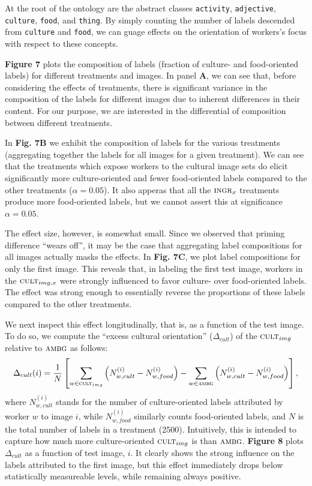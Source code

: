 \documentclass[a4paper]{report}
\begin{document}
At the root of the ontology are the abstract classes \texttt{activity}, 
\texttt{adjective}, \texttt{culture}, \texttt{food}, and \texttt{thing}.
By simply counting the number of labels descended from \texttt{culture}
and \texttt{food}, we can guage effects on the orientation of workers's focus
with respect to these concepts.

\textbf{Figure 7} plots the composition of labels (fraction of culture- and 
food-oriented labels) for different treatments and images.  In 
panel \textbf{A}, we can see that, before considering the effects of 
treatments, there is significant variance in the composition of the labels 
for different images due to inherent differences in their content.  For our 
purpose, we are interested in the differential of composition between 
different treatments.

In \textbf{Fig. 7B} we exhibit the composition of labels for the various 
treatments (aggregating together the labels for all images for a given 
treatment).  We can see that the treatments which expose workers to the
cultural image sets do elicit significantly more culture-oriented and fewer
food-oriented labels compared to the other treatments ($\alpha=0.05$).  It 
also apperas that all the $\textsc{ingr}_x$ treatments produce more 
food-oriented labels, but we cannot assert this at significance 
$\alpha = 0.05$. 

The effect size, however, is somewhat small.  Since we observed that priming 
difference ``wears off'', it may be the case 
that aggregating label compositions for all images actually masks the effects. 
In \textbf{Fig. 7C}, we plot label compositions for only the first
image.  This reveals that, in labeling the first test image, workers in the
$\textsc{cult}_{img,x}$ were strongly influenced to favor culture- over 
food-oriented labels.  The effect was strong enough to essentially reverse 
the proportions of these labels compared to the other treatments.

We next inspect this effect longitudinally, that is, as a function of 
the test image.  To do so, we compute the ``excess cultural orientation'' 
($\Delta_{cult}$) of
the $\textsc{cult}_{img}$ relative to $\textsc{ambg}$ as follows: 
\begin{align}
	\Delta_{cult}(i) = \frac{1}{N}\left[ \sum_{w\in\textsc{cult}_{img}} \left(N_{w,cult}^{(i)} - N_{w,food}^{(i)}\right)
	- \sum_{w\in\textsc{ambg}} \left(N_{w,cult}^{(i)} - N_{w,food}^{(i)}\right)\right],
\end{align}
where $N_{w,cult}^{(i)}$ stands for the number of culture-oriented labels 
attributed by worker $w$ to image $i$, while $N_{w,food}^{(i)}$ similarly 
counts food-oriented labels, and $N$ is the total number of labels in a 
treatment (2500).  
Intuitively, this is intended to capture how much 
more culture-oriented $\textsc{cult}_{img}$ is than $\textsc{ambg}$.  
\textbf{Figure 8} plots $\Delta_{cult}$ as a function of test image, $i$. It
clearly shows the strong influence on the labels attributed to the first image,
but this effect immediately drops below statistically measureable levels, while
remaining always positive.
\end{document}
